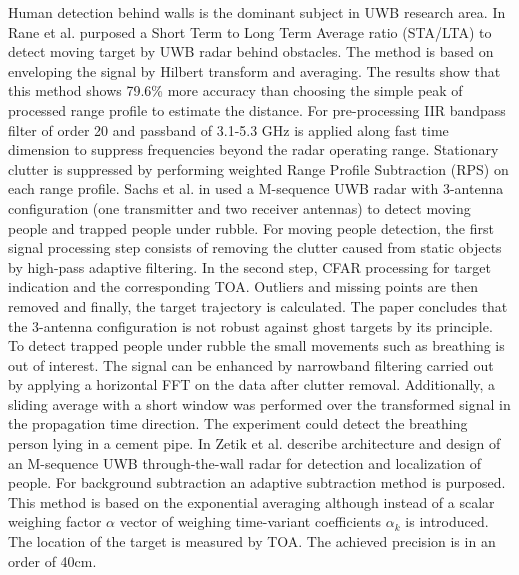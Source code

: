 Human detection behind walls is the dominant subject in UWB research area. 
In \cite{RaneMovintargetUWB} Rane et al. purposed a Short Term to Long Term Average ratio (STA/LTA) to detect moving target by UWB radar behind obstacles. The method is based on enveloping the signal by Hilbert transform and averaging. The results show that this method shows 79.6\% more accuracy than choosing the simple peak of processed range profile to estimate the distance. For pre-processing IIR bandpass filter of order 20 and passband of 3.1-5.3 GHz is applied along fast time dimension to suppress frequencies beyond the radar operating range. Stationary clutter is suppressed by performing weighted Range Profile Subtraction (RPS) on each range profile.
Sachs et al. in \cite{Sachs2008} used a M-sequence UWB radar with 3-antenna configuration (one transmitter and two receiver antennas) to detect moving people and trapped people under rubble. For moving people detection, the first signal processing step consists of removing the clutter caused from static objects by high-pass adaptive filtering. In the second step, CFAR processing for target indication and the corresponding TOA. Outliers and missing points are then removed and finally, the target trajectory is calculated. The paper concludes that the 3-antenna configuration is not robust against ghost targets by its principle. To detect trapped people under rubble the small movements such as breathing is out of interest. The signal can be enhanced by narrowband filtering carried out by applying a horizontal FFT on the data after clutter removal. Additionally, a sliding average with a short window was performed over the transformed signal in the propagation time direction. The experiment could detect the breathing person lying in a cement pipe.
In \cite{Zetik} Zetik et al. describe architecture and design of an M-sequence UWB through-the-wall radar for detection and localization of people. For background subtraction an adaptive subtraction method is purposed. This method is based on the exponential averaging although instead of a scalar weighing factor $\alpha$ vector of weighing time-variant coefficients ${\alpha}_k$ is introduced. The location of the target is measured by TOA. The achieved precision is in an order of 40cm.

